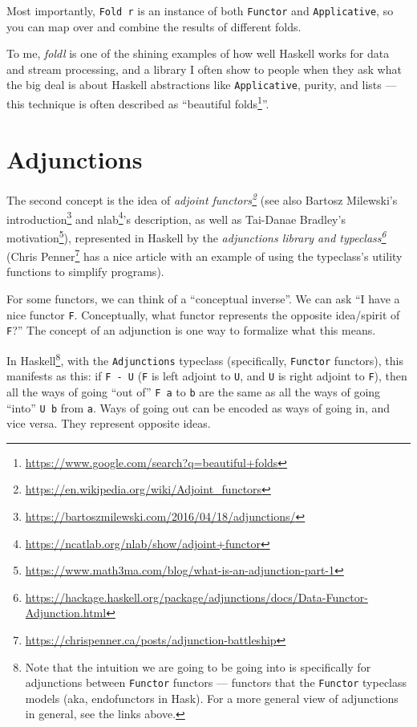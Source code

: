 \documentclass[]{article}
\renewcommand{\href}[2]{#2\footnote{\url{#1}}}
\begin{document}
Most importantly, \texttt{Fold\ r} is an instance of both \texttt{Functor} and
\texttt{Applicative}, so you can map over and combine the results of different
folds.

To me, \emph{foldl} is one of the shining examples of how well Haskell works for
data and stream processing, and a library I often show to people when they ask
what the big deal is about Haskell abstractions like \texttt{Applicative},
purity, and lists --- this technique is often described as
``\href{https://www.google.com/search?q=beautiful+folds}{beautiful folds}''.

\section{Adjunctions}\label{adjunctions}

The second concept is the idea of
\emph{\href{https://en.wikipedia.org/wiki/Adjoint_functors}{adjoint functors}}
(see also \href{https://bartoszmilewski.com/2016/04/18/adjunctions/}{Bartosz
Milewski's introduction} and
\href{https://ncatlab.org/nlab/show/adjoint+functor}{nlab}'s description, as
well as
\href{https://www.math3ma.com/blog/what-is-an-adjunction-part-1}{Tai-Danae
Bradley's motivation}), represented in Haskell by the
\emph{\href{https://hackage.haskell.org/package/adjunctions/docs/Data-Functor-Adjunction.html}{adjunctions
library and typeclass}}
(\href{https://chrispenner.ca/posts/adjunction-battleship}{Chris Penner} has a
nice article with an example of using the typeclass's utility functions to
simplify programs).

For some functors, we can think of a ``conceptual inverse''. We can ask ``I have
a nice functor \texttt{F}. Conceptually, what functor represents the opposite
idea/spirit of \texttt{F}?'' The concept of an adjunction is one way to
formalize what this means.

In Haskell\footnote{Note that the intuition we are going to be going into is
  specifically for adjunctions between \texttt{Functor} functors --- functors
  that the \texttt{Functor} typeclass models (aka, endofunctors in Hask). For a
  more general view of adjunctions in general, see the links above.}, with the
\texttt{Adjunctions} typeclass (specifically, \texttt{Functor} functors), this
manifests as this: if \texttt{F\ -\textbar{}\ U} (\texttt{F} is left adjoint to
\texttt{U}, and \texttt{U} is right adjoint to \texttt{F}), then all the ways of
going ``out of'' \texttt{F\ a} to \texttt{b} are the same as all the ways of
going ``into'' \texttt{U\ b} from \texttt{a}. Ways of going out can be encoded
as ways of going in, and vice versa. They represent opposite ideas.
\end{document}
